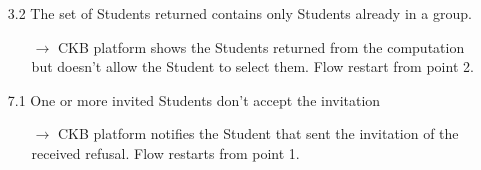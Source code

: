 \documentclass{article}
\begin{document}
{\begin{enumerate}
\begin{xltabular}{\textwidth}
\begin{itemize}
                        doesn't contain any available Student.
                        \begin{itemize}
                            \item[$\rightarrow$] CKB platform shows an empty list, with
                                  a message explaining the absence of Students in the list. Flow restarts from point 2.
                        \end{itemize}
                  \item[3.2] The set of Students returned contains only Students
                        already in a group.
                        \begin{itemize}
                            \item[$\rightarrow$] CKB platform shows the Students returned
                                  from the computation but doesn't allow the Student to select them.
                                  Flow restart from point 2.
                        \end{itemize}
                  \item[7.1] One or more invited Students don't accept the invitation
                        \begin{itemize}
                            \item[$\rightarrow$] CKB platform notifies the Student that sent the invitation
                                  of the received refusal. Flow restarts from point 1.
                        \end{itemize}
              \end{itemize}
          \end{xltabular}


\end{enumerate}}
\end{document}

